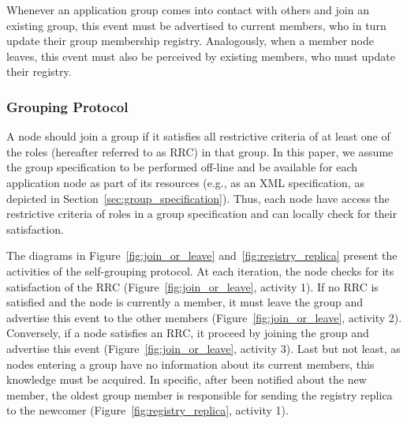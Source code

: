 Whenever an application group comes into contact with others and join an existing group, this event must be  advertised to current members, who in turn update their group membership registry. Analogously, when a member node leaves, this event must also be perceived by existing members, who must update their registry.

\subsubsection{\textbf{Grouping Protocol}} 

A node should join a group if it satisfies all restrictive criteria of at least one of the roles (hereafter referred to as RRC) in that group. In this paper, we assume the group specification to be performed off-line and be available for each application node as part of its resources (e.g., as an XML specification, as depicted in Section~\ref{sec:group_specification}). Thus, each node have access the restrictive criteria of roles in a group specification and can locally check for their satisfaction. 


The diagrams in Figure~\ref{fig:join_or_leave} and~\ref{fig:registry_replica} present the activities of the self-grouping protocol. At each iteration, the node checks for its satisfaction of the RRC (Figure~\ref{fig:join_or_leave}, activity 1). If no RRC is satisfied and the node is currently a member, it must leave the group and advertise this event to the other members (Figure~\ref{fig:join_or_leave}, activity 2). Conversely, if a node satisfies an RRC, it proceed by joining the group and advertise this event (Figure~\ref{fig:join_or_leave}, activity 3). Last but not least, as nodes entering a group have no information about its current members, this knowledge must be acquired. In specific, after been notified about the new member, the oldest group member is responsible for sending the registry replica to the newcomer (Figure~\ref{fig:registry_replica}, activity 1).


